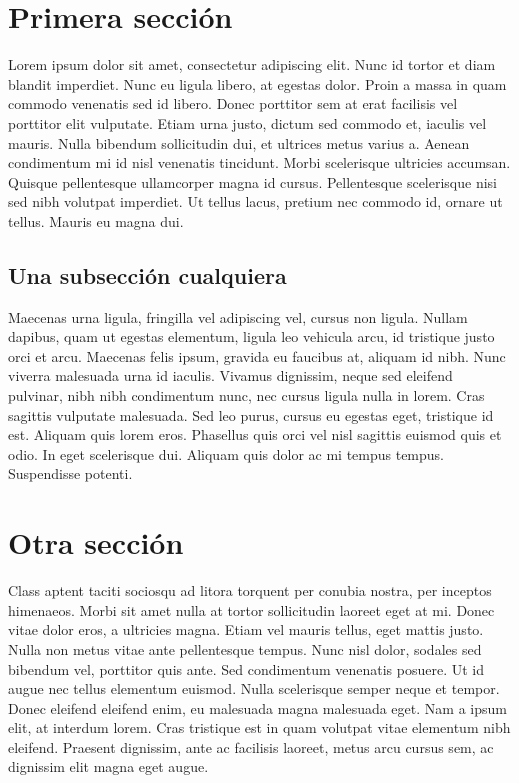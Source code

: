 \documentclass[a4paper,10pt]{article}
\begin{document}
\begin{multicols}{3}

\section{Primera sección}
Lorem ipsum dolor sit amet, consectetur adipiscing elit. Nunc id tortor et diam blandit imperdiet. Nunc eu ligula libero, at egestas dolor. 
Proin a massa in quam commodo venenatis sed id libero. Donec porttitor sem at erat facilisis vel porttitor elit vulputate. Etiam urna justo, 
dictum sed commodo et, iaculis vel mauris. Nulla bibendum sollicitudin dui, et ultrices metus varius a. Aenean condimentum mi id nisl 
venenatis tincidunt. Morbi scelerisque ultricies accumsan. Quisque pellentesque ullamcorper magna id cursus. Pellentesque scelerisque nisi 
sed nibh volutpat imperdiet. Ut tellus lacus, pretium nec commodo id, ornare ut tellus. Mauris eu magna dui.

\subsection{Una subsección cualquiera}
Maecenas urna ligula, fringilla vel adipiscing vel, cursus non ligula. Nullam dapibus, quam ut egestas elementum, ligula leo vehicula arcu, 
id tristique justo orci et arcu. Maecenas felis ipsum, gravida eu faucibus at, aliquam id nibh. Nunc viverra malesuada urna id iaculis. 
Vivamus dignissim, neque sed eleifend pulvinar, nibh nibh condimentum nunc, nec cursus ligula nulla in lorem. Cras sagittis vulputate 
malesuada. Sed leo purus, cursus eu egestas eget, tristique id est. Aliquam quis lorem eros. Phasellus quis orci vel nisl sagittis euismod 
quis et odio. In eget scelerisque dui. Aliquam quis dolor ac mi tempus tempus. Suspendisse potenti.

\section{Otra sección}
Class aptent taciti sociosqu ad litora torquent per conubia nostra, per inceptos himenaeos. Morbi sit amet nulla at tortor sollicitudin 
laoreet eget at mi. Donec vitae dolor eros, a ultricies magna. Etiam vel mauris tellus, eget mattis justo. Nulla non metus vitae ante 
pellentesque tempus. Nunc nisl dolor, sodales sed bibendum vel, porttitor quis ante. Sed condimentum venenatis posuere. Ut id augue nec 
tellus elementum euismod. Nulla scelerisque semper neque et tempor. Donec eleifend eleifend enim, eu malesuada magna malesuada eget. Nam a 
ipsum elit, at interdum lorem. Cras tristique est in quam volutpat vitae elementum nibh eleifend. Praesent dignissim, ante ac facilisis 
laoreet, metus arcu cursus sem, ac dignissim elit magna eget augue.


\end{multicols}
\end{document}

